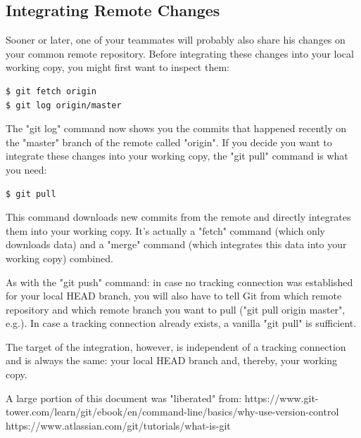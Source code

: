 \documentclass{article}
\begin{document}
\subsection{Integrating Remote Changes}
Sooner or later, one of your teammates will probably also share his changes on your common remote repository. Before integrating these changes into your local working copy, you might first want to inspect them:
\begin{lstlisting}[language=bash]
$ git fetch origin
$ git log origin/master
\end{lstlisting}
The "git log" command now shows you the commits that happened recently on the "master" branch of the remote called "origin".
\newline
If you decide you want to integrate these changes into your working copy, the "git pull" command is what you need:
\begin{lstlisting}[lauguage=bash]
$ git pull
\end{lstlisting}

This command downloads new commits from the remote and directly integrates them into your working copy. It's actually a "fetch" command (which only downloads data) and a "merge" command (which integrates this data into your working copy) combined.

As with the "git push" command: in case no tracking connection was established for your local HEAD branch, you will also have to tell Git from which remote repository and which remote branch you want to pull ("git pull origin master", e.g.). In case a tracking connection already exists, a vanilla "git pull" is sufficient.

The target of the integration, however, is independent of a tracking connection and is always the same: your local HEAD branch and, thereby, your working copy.


\begin{thebibliography}{9}
A large portion of this document was "liberated" from:
https://www.git-tower.com/learn/git/ebook/en/command-line/basics/why-use-version-control
https://www.atlassian.com/git/tutorials/what-is-git
\end{thebibliography}
\end{document}
